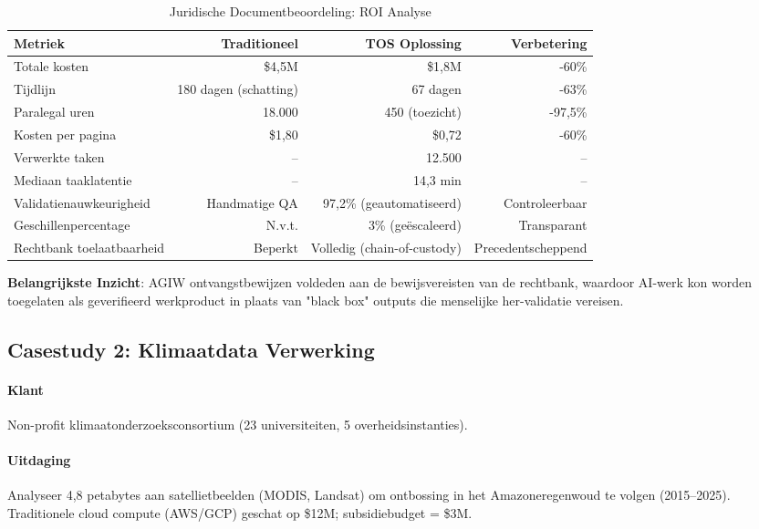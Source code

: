 \documentclass[11pt]{article}
\begin{document}
\begin{table}[H]
\centering
\caption{Juridische Documentbeoordeling: ROI Analyse}
\label{tab:legal-roi}
\begin{tabular}{@{}lrrr@{}}
\toprule
\textbf{Metriek} & \textbf{Traditioneel} & \textbf{TOS Oplossing} & \textbf{Verbetering} \\ \midrule
Totale kosten & \$4,5M & \$1,8M & -60\% \\
Tijdlijn & 180 dagen (schatting) & 67 dagen & -63\% \\
Paralegal uren & 18.000 & 450 (toezicht) & -97,5\% \\
Kosten per pagina & \$1,80 & \$0,72 & -60\% \\
Verwerkte taken & -- & 12.500 & -- \\
Mediaan taaklatentie & -- & 14,3 min & -- \\
Validatienauwkeurigheid & Handmatige QA & 97,2\% (geautomatiseerd) & Controleerbaar \\
Geschillenpercentage & N.v.t. & 3\% (geëscaleerd) & Transparant \\
Rechtbank toelaatbaarheid & Beperkt & Volledig (chain-of-custody) & Precedentscheppend \\
\bottomrule
\end{tabular}
\end{table}

\textbf{Belangrijkste Inzicht}: AGIW ontvangstbewijzen voldeden aan de bewijsvereisten van de rechtbank, waardoor AI-werk kon worden toegelaten als geverifieerd werkproduct in plaats van "black box" outputs die menselijke her-validatie vereisen.

\subsection{Casestudy 2: Klimaatdata Verwerking}

\paragraph{Klant} Non-profit klimaatonderzoeksconsortium (23 universiteiten, 5 overheidsinstanties).

\paragraph{Uitdaging} Analyseer 4,8 petabytes aan satellietbeelden (MODIS, Landsat) om ontbossing in het Amazoneregenwoud te volgen (2015--2025). Traditionele cloud compute (AWS/GCP) geschat op \$12M; subsidiebudget = \$3M.
\end{document}
